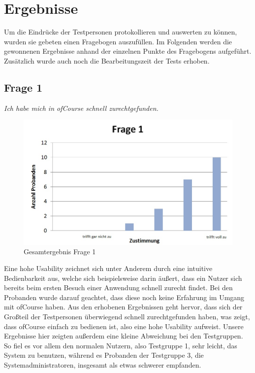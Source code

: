 \section{Ergebnisse}
Um die Eindrücke der Testpersonen protokollieren und auswerten zu können, wurden sie gebeten einen Fragebogen auszufüllen.
Im Folgenden werden die gewonnenen Ergebnisse anhand der einzelnen Punkte des Fragebogens aufgeführt. Zusätzlich
wurde auch noch die Bearbeitungszeit der Tests erhoben.

\subsection{Frage 1}
\begin{center}
	{\it Ich habe mich in ofCourse schnell zurechtgefunden.}
\end{center}
\begin{figure}[h]
\centering
\includegraphics[width=0.7\linewidth]{img/Frage1}
\caption{Gesamtergebnis Frage 1}
\label{fig:Frage1}
\end{figure}
Eine hohe Usability zeichnet sich unter Anderem durch eine intuitive Bedienbarkeit aus, welche sich beispielsweise darin äußert, dass ein Nutzer sich bereits beim ersten Besuch einer Anwendung schnell zurecht findet. Bei den Probanden wurde darauf geachtet, dass diese noch keine Erfahrung im Umgang mit ofCourse haben. Aus den erhobenen Ergebnissen geht hervor, dass sich der Großteil der Testpersonen überwiegend schnell zurechtgefunden haben, was zeigt, dass ofCourse einfach zu bedienen ist, also eine hohe Usability aufweist. Unsere Ergebnisse hier zeigten außerdem eine kleine Abweichung bei den Testgruppen. So fiel es vor allem den normalen Nutzern, also Testgruppe 1, sehr leicht, das System zu benutzen, während es Probanden der Testgruppe 3, die Systemadministratoren, insgesamt als etwas schwerer empfanden.
\newpage
